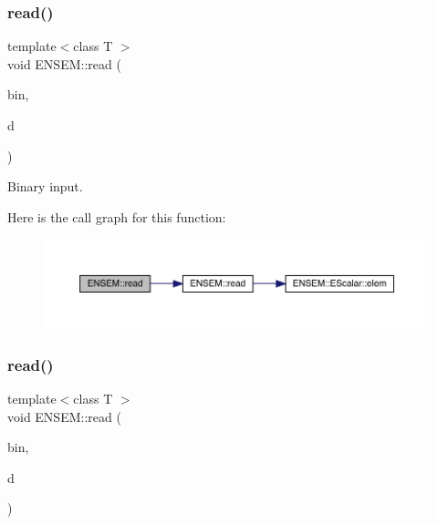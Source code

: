 \subsubsection{\texorpdfstring{read()}{read()}\hspace{0.1cm}{\footnotesize\ttfamily [8/11]}}
{\footnotesize\ttfamily template$<$class T $>$ \\
void E\+N\+S\+E\+M\+::read (\begin{DoxyParamCaption}\item[{\mbox{\hyperlink{classADATIO_1_1BinaryReader}{A\+D\+A\+T\+I\+O\+::\+Binary\+Reader}} \&}]{bin,  }\item[{\mbox{\hyperlink{classENSEM_1_1Ensem}{Ensem}}$<$ \mbox{\hyperlink{classENSEM_1_1OScalar}{O\+Scalar}}$<$ T $>$ $>$ \&}]{d }\end{DoxyParamCaption})\hspace{0.3cm}{\ttfamily [inline]}}



Binary input. 

Here is the call graph for this function\+:\nopagebreak
\begin{figure}[H]
\begin{center}
\leavevmode
\includegraphics[width=350pt]{d2/d94/namespaceENSEM_a6dcfc9e12db208a46499969e1cc0088d_cgraph}
\end{center}
\end{figure}
\mbox{\label{namespaceENSEM_aebc1e0b81049724d5c9a99befb160609}} 
\subsubsection{\texorpdfstring{read()}{read()}\hspace{0.1cm}{\footnotesize\ttfamily [9/11]}}
{\footnotesize\ttfamily template$<$class T $>$ \\
void E\+N\+S\+E\+M\+::read (\begin{DoxyParamCaption}\item[{\mbox{\hyperlink{classADATIO_1_1BinaryReader}{A\+D\+A\+T\+I\+O\+::\+Binary\+Reader}} \&}]{bin,  }\item[{\mbox{\hyperlink{classENSEM_1_1Ensem}{Ensem}}$<$ \mbox{\hyperlink{classENSEM_1_1OVector}{O\+Vector}}$<$ T $>$ $>$ \&}]{d }\end{DoxyParamCaption})\hspace{0.3cm}{\ttfamily [inline]}}



